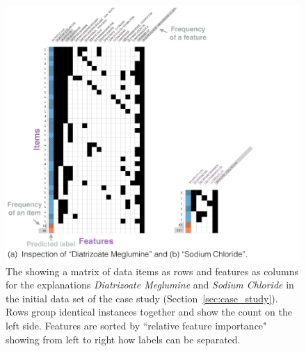\begin{figure}
\centering
\includegraphics[width=\linewidth]{explainer/inspect1}
\caption[The \tabC.]{
The \textbf{\tabC} showing a matrix of data items as rows and features as columns for the explanations \emph{Diatrizoate Meglumine} and \emph{Sodium Chloride} in the initial data set of the case study (Section~\ref{sec:case_study}).
Rows group identical instances together and show the count on the left side.
Features are sorted by ``relative feature importance" showing from left to right how labels can be separated.
}
\label{figs:inspect_all}
\end{figure}